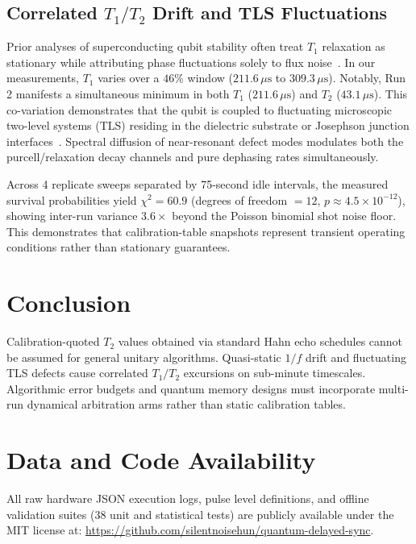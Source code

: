 \documentclass[11pt,a4paper]{article}
\begin{document}
\subsection{Correlated $T_1/T_2$ Drift and TLS Fluctuations}
Prior analyses of superconducting qubit stability often treat $T_1$ relaxation as stationary while attributing phase fluctuations solely to flux noise~\cite{koch2007transmon}. In our measurements, $T_1$ varies over a $46\%$ window ($211.6\,\mu\text{s}$ to $309.3\,\mu\text{s}$). Notably, Run 2 manifests a simultaneous minimum in both $T_1$ ($211.6\,\mu\text{s}$) and $T_2$ ($43.1\,\mu\text{s}$). This co-variation demonstrates that the qubit is coupled to fluctuating microscopic two-level systems (TLS) residing in the dielectric substrate or Josephson junction interfaces~\cite{burnett2019,muller2019tls,place2021}. Spectral diffusion of near-resonant defect modes modulates both the purcell/relaxation decay channels and pure dephasing rates simultaneously.

Across 4 replicate sweeps separated by 75-second idle intervals, the measured survival probabilities yield $\chi^2 = 60.9$ (degrees of freedom $= 12$, $p \approx 4.5 \times 10^{-12}$), showing inter-run variance $3.6\times$ beyond the Poisson binomial shot noise floor. This demonstrates that calibration-table snapshots represent transient operating conditions rather than stationary guarantees.

\section{Conclusion}
Calibration-quoted $T_2$ values obtained via standard Hahn echo schedules cannot be assumed for general unitary algorithms. Quasi-static $1/f$ drift and fluctuating TLS defects cause correlated $T_1/T_2$ excursions on sub-minute timescales. Algorithmic error budgets and quantum memory designs must incorporate multi-run dynamical arbitration arms rather than static calibration tables.

\section*{Data and Code Availability}
All raw hardware JSON execution logs, pulse level definitions, and offline validation suites (38 unit and statistical tests) are publicly available under the MIT license at: \url{https://github.com/silentnoisehun/quantum-delayed-sync}.
\end{document}

